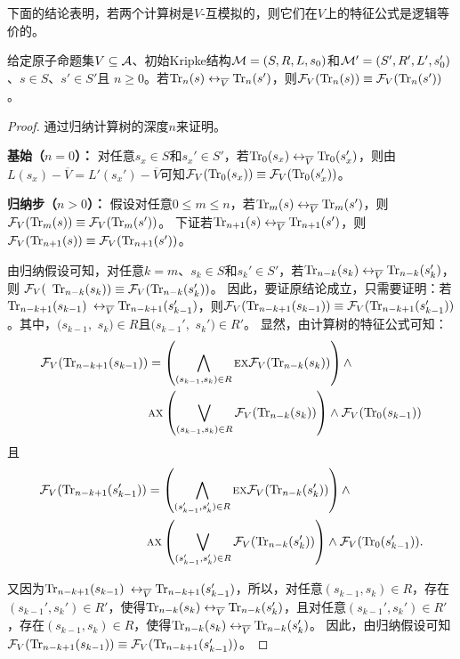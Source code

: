 下面的结论表明，若两个计算树是$V$-互模拟的，则它们在$V$上的特征公式是逻辑等价的。
\begin{lemma}\label{lem:Vb:TrFormula:Equ}
	给定原子命题集$V\subseteq {\cal A}$、初始Kripke结构${\cal M}=(S,R,L,s_0)$和${\cal M}'=(S',R',L',s_0')$、$s\in S$、$s'\in S'$且 $n\ge 0$。若$\textrm{Tr}_n(s) \leftrightarrow_{\overline V} \textrm{Tr}_n(s')$，则${\cal F}_V(\textrm{Tr}_n(s)) \equiv {\cal F}_V(\textrm{Tr}_n(s'))$。
\end{lemma}
\begin{proof}
	通过归纳计算树的深度$n$来证明。
	
	\textbf{基始（$n=0$）：} 对任意$s_x\in S$和$s_x' \in S'$，若$\textrm{Tr}_0(s_x) \leftrightarrow_{\overline V} \textrm{Tr}_0(s_x')$，则由$L(s_x) - \overline V = L'(s_x') - \overline V$可知${\cal F}_V(\textrm{Tr}_0(s_x)) \equiv {\cal F}_V(\textrm{Tr}_0(s_x'))$。
	
	\textbf{归纳步（$n>0$）：} 假设对任意$0\leq m \leq n$，若$\textrm{Tr}_m(s) \leftrightarrow_{\overline V} \textrm{Tr}_m(s')$，则${\cal F}_V(\textrm{Tr}_m(s)) \equiv {\cal F}_V(\textrm{Tr}_m(s'))$。
	下证若$\textrm{Tr}_{n+1}(s) \leftrightarrow_{\overline V} \textrm{Tr}_{n+1}(s')$，则${\cal F}_V(\textrm{Tr}_{n+1}(s)) \equiv {\cal F}_V(\textrm{Tr}_{n+1}(s'))$。
	
	由归纳假设可知，对任意$k=m$、$s_k\in S$和$s_k'\in S'$，若$\textrm{Tr}_{n-k}(s_k) \leftrightarrow_{\overline V} \textrm{Tr}_{n-k}(s_k')$，则 ${\cal F}_V($ $\textrm{Tr}_{n-k}(s_k)) \equiv {\cal F}_V(\textrm{Tr}_{n-k}(s_k'))$。
	因此，要证原结论成立，只需要证明：若$\textrm{Tr}_{n-k+1}(s_{k-1})$ $\leftrightarrow_{\overline V} \textrm{Tr}_{n-k+1}(s_{k-1}')$，则${\cal F}_V(\textrm{Tr}_{n-k+1}(s_{k-1})) \equiv {\cal F}_V(\textrm{Tr}_{n-k+1}(s_{k-1}'))$。其中，$(s_{k-1},$ $s_k)\in R$且$(s_{k-1}',$ $s_k')\in R'$。
	显然，由计算树的特征公式可知：
	\begin{align*}
		{\cal F}_V(\textrm{Tr}_{n-k+1}(s_{k-1})) &  =
		\left(\bigwedge_{(s_{k-1},s_k)\in R}
		\textsc{e} \textsc{x} {\cal F}_V(\textrm{Tr}_{n-k}(s_k))\right)
		\wedge \\
		&\textsc{a} \textsc{x}\left(\bigvee_{(s_{k-1},s_k)\in R}
		{\cal F}_V(\textrm{Tr}_{n-k}(s_k) )\right)
		\wedge {\cal F}_V(\textrm{Tr}_0(s_{k-1}))
	\end{align*}
	且
	\begin{align*}
		{\cal F}_V(\textrm{Tr}_{n-k+1}(s_{k-1}')) &  =
		\left(\bigwedge_{(s_{k-1}',s_k')\in R}
		\textsc{e} \textsc{x} {\cal F}_V(\textrm{Tr}_{n-k}(s_k'))\right)
		\wedge \\
		&\textsc{a} \textsc{x}\left(\bigvee_{(s_{k-1}',s_k')\in R}
		{\cal F}_V(\textrm{Tr}_{n-k}(s_k') )\right)
		\wedge {\cal F}_V(\textrm{Tr}_0(s_{k-1}')).
	\end{align*} 
	
	又因为$\textrm{Tr}_{n-k+1}(s_{k-1})$ $\leftrightarrow_{\overline V} \textrm{Tr}_{n-k+1}(s_{k-1}')$，所以，对任意$(s_{k-1}, s_k) \in R$，存在$(s_{k-1}', s_k') \in R'$，使得$\textrm{Tr}_{n-k}(s_k) \leftrightarrow_{\overline V} \textrm{Tr}_{n-k}(s_k')$，且对任意$(s_{k-1}', s_k') \in R'$，存在$(s_{k-1}, s_k) \in R$，使得$\textrm{Tr}_{n-k}(s_k) \leftrightarrow_{\overline V} \textrm{Tr}_{n-k}(s_k')$。
	因此，由归纳假设可知${\cal F}_V(\textrm{Tr}_{n-k+1}(s_{k-1})) \equiv {\cal F}_V(\textrm{Tr}_{n-k+1}(s_{k-1}'))$。
\end{proof}

